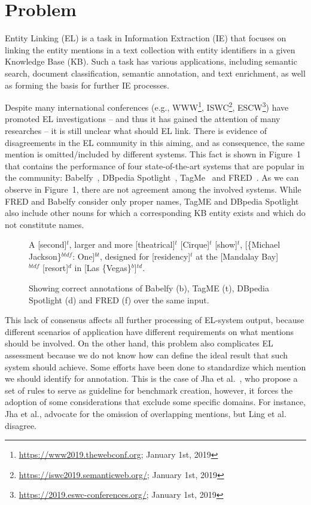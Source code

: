 \documentclass[sigconf]{acmart}
\begin{document}
\section{Problem}

Entity Linking (EL) is a task in Information Extraction (IE) that focuses on linking the entity mentions in a text collection with entity identifiers in a given Knowledge Base (KB). Such a task has various applications, including semantic search, document classification, semantic annotation, and text enrichment, as well as forming the basis for further IE processes. 

Despite many international conferences (e.g., WWW\footnote{\url{https://www2019.thewebconf.org}; January 1st, 2019}, ISWC\footnote{\url{https://iswc2019.semanticweb.org/}; January 1st, 2019}, ESCW\footnote{\url{https://2019.eswc-conferences.org/}; January 1st, 2019}) have promoted EL investigations -- and thus it has gained the attention of many researches -- it is still unclear what should EL link. There is evidence of disagreements in the EL community in this aiming, and as consequence, the same mention is omitted/included by different systems. This fact is shown in Figure~1 that contains the performance of four state-of-the-art systems that are popular in the community: Babelfy~\cite{0001RN14}, DBpedia Spotlight~\cite{MendesJGB11}, TagMe~\cite{FerraginaS10} and FRED~\cite{GangemiPRNDM17}. As we can observe in Figure~1, there are not agreement among the involved systems. While FRED and Babelfy consider only proper names, TagME and DBpedia Spotlight also include other nouns for which a corresponding KB entity exists and which do not constitute names.

\begin{figure}[!thb]
\label{fig:exp1}
\begin{mdframed}
A [second]$^{t}$, larger and more [theatrical]$^{t}$ [Cirque]$^{t}$ [show]$^{t}$, [\{Michael Jackson\}$^{btdf}$: One]$^{bt}$, designed for [residency]$^{t}$ at the [Mandalay Bay]$^{btdf}$ [resort]$^{d}$ in [Las \{Vegas\}$^{b}$]$^{td}$.
\end{mdframed}
\caption{Showing correct annotations of Babelfy (b), TagME (t), DBpedia Spotlight (d) and FRED (f) over the same input.}
\end{figure}

This lack of consensus affects all further processing of EL-system output, because different  scenarios of application have different requirements on what mentions should be involved. On the other hand, this problem also complicates EL assessment because we do not know how can define the ideal result that such system should achieve. Some efforts have been done to standardize which mention we should identify for annotation. This is the case of Jha et al.~\cite{JhaRN17}, who propose a set of rules to serve as guideline for benchmark creation, however, it forces the adoption of some considerations that exclude some specific domains. For instance, Jha et al., advocate for the omission of overlapping mentions, but Ling et al.~\cite{LingSW15} disagree. 
\end{document}
